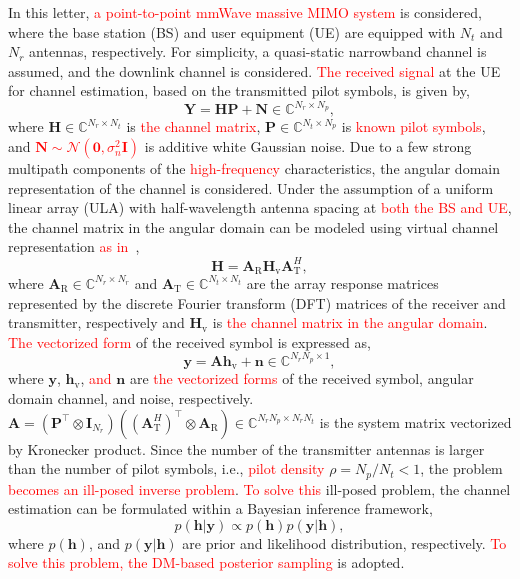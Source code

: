 \documentclass[lettersize,journal]{IEEEtran}
\newcommand{\tred}{\textcolor{red}}
\begin{document}
In this letter, \tred{a point-to-point mmWave massive MIMO system} is considered, where the base station (BS) and user equipment (UE) are equipped with $N_{t}$ and $N_{r}$ antennas, respectively. For simplicity, a quasi-static narrowband channel is assumed, and the downlink channel is considered. \tred{The received signal} at the UE for channel estimation, based on the transmitted pilot symbols, is given by,
\begin{equation}
\mathbf{Y}=\mathbf{H}\mathbf{P}+\mathbf{N}\in \mathbb{C}^{N_{r}\times N_{p}},
\end{equation}
where $\mathbf{H}\in \mathbb{C}^{N_{r}\times N_{t}}$ is \tred{the channel matrix}, $\mathbf{P}\in \mathbb{C}^{N_{t}\times N_{p}}$ is \tred{known pilot symbols}, and \tred{$\mathbf{N}\sim\mathcal{N}(\mathbf{0},\sigma^{2}_{n}\mathbf{I})$} is additive white Gaussian noise. Due to a few strong multipath components of the \tred{high-frequency} characteristics, the angular domain representation of the channel is considered. Under the assumption of a uniform linear array (ULA) with half-wavelength antenna spacing at \tred{both the BS and UE}, the channel matrix in the angular domain can be modeled using virtual channel representation \tred{as in}~\cite{sayeedDeconstructingMultiantennaFading2002},
\begin{equation}
\mathbf{H} = \mathbf{A}_{\text{R}}\mathbf{H}_{\text{v}}\mathbf{A}_{\text{T}}^{H},
\end{equation}
where $\mathbf{A}_{\text{R}}\in \mathbb{C}^{N_{r}\times N_{r}}$ and $\mathbf{A}_{\text{T}}\in \mathbb{C}^{N_{t}\times N_{t}}$ are the array response matrices represented by the discrete Fourier transform (DFT) matrices of the receiver and transmitter, respectively and $\mathbf{H}_{\text{v}}$ is \tred{the channel matrix in the angular domain}.
\tred{The vectorized form} of the received symbol is expressed as,
\begin{equation}
\mathbf{y} = \mathbf{A}\mathbf{h}_{\text{v}}+\mathbf{n}\in \mathbb{C}^{N_{r}N_{p}\times 1},
\end{equation}
where $\mathbf{y}$, $\mathbf{h}_{\text{v}}$, \tred{and} $\mathbf{n}$ are \tred{the vectorized forms} of the received symbol, angular domain channel, and noise, respectively. $\mathbf{A}=(\mathbf{P}^{\top}\otimes\mathbf{I}_{N_{r}})((\mathbf{A}_{\text{T}}^{H})^{\top}\otimes \mathbf{A}_{\text{R}})\in \mathbb{C}^{N_{r}N_{p}\times N_{r}N_{t}}$ is the system matrix vectorized by Kronecker product.
Since the number of the transmitter antennas is larger than the number of pilot symbols, i.e., \tred{pilot density} $\rho=N_{p}/N_{t}<1$, the problem \tred{becomes an ill-posed inverse problem}.
\tred{To solve this} ill-posed problem, the channel estimation can be formulated within a Bayesian inference framework,
\begin{equation}
  p(\mathbf{h}|\mathbf{y})\propto p(\mathbf{h})p(\mathbf{y}|\mathbf{h}),
\end{equation}
where $p(\mathbf{h})$, and $p(\mathbf{y}|\mathbf{h})$ are prior and likelihood distribution, respectively. \tred{To solve this problem, the DM-based posterior sampling} is adopted.
\end{document}
